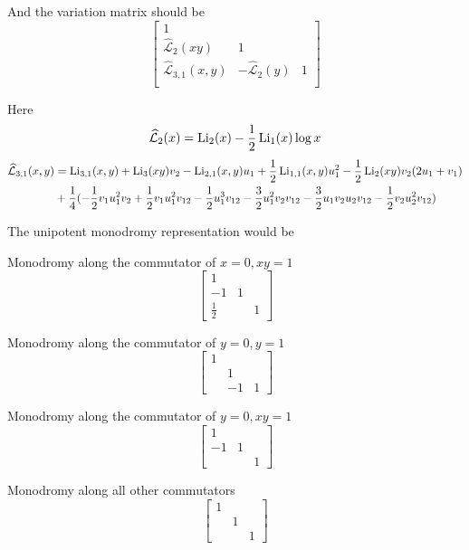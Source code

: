 \documentclass[main]{subfiles}
\begin{document}
And the variation matrix should be
\[
\begin{bmatrix}
1\\
\widehat{\mathcal L}_2(xy)&1\\
\widehat{\mathcal L}_{3,1}(x,y)&-\widehat{\mathcal L}_2(y)&1\\
\end{bmatrix}
\]

Here
\[\widehat{\mathcal L}_2(x)=\operatorname{Li}_2(x)-\frac{1}{2}\operatorname{Li}_1(x)\log x\]
\begin{align*}
\widehat{\mathcal L}_{3,1}(x,y)&=\operatorname{Li}_{3,1}(x,y)+\operatorname{Li}_3(xy)v_2-\operatorname{Li}_{2,1}(x,y)u_1+\frac{1}{2}\operatorname{Li}_{1,1}(x,y)u_1^2-\frac{1}{2}\operatorname{Li}_2(xy)v_2(2u_1+v_1)\\
&+\frac{1}{4}(-\frac{1}{2}v_1u_1^2v_2+\frac{1}{2}v_1u_1^2v_{12}-\frac{1}{2}u_1^3v_{12}-\frac{3}{2}u_1^2v_2v_{12}-\frac{3}{2}u_1v_2u_2v_{12}-\frac{1}{2}v_2u_2^2v_{12})
\end{align*}

The unipotent monodromy representation would be

Monodromy along the commutator of $x=0,xy=1$
\[
\begin{bmatrix}
1\\
-1&1\\
\frac{1}{2}&&1
\end{bmatrix}
\]

Monodromy along the commutator of $y=0,y=1$
\[
\begin{bmatrix}
1\\
&1\\
&-1&1
\end{bmatrix}
\]

Monodromy along the commutator of $y=0,xy=1$
\[
\begin{bmatrix}
1\\
-1&1\\
&&1
\end{bmatrix}
\]

Monodromy along all other commutators
\[
\begin{bmatrix}
1\\
&1\\
&&1
\end{bmatrix}
\]
\end{document}
